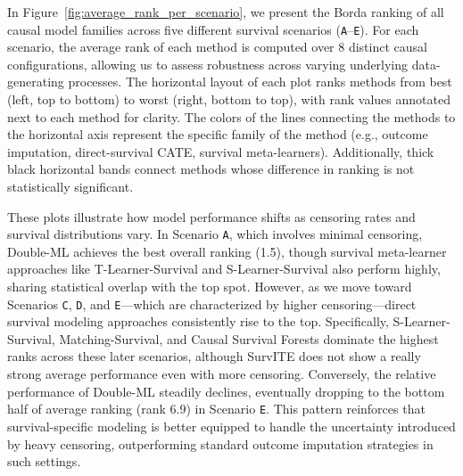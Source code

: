 \documentclass{article} %
\begin{document}
In Figure~\ref{fig:average_rank_per_scenario}, we present the Borda ranking of all causal model families across five different survival scenarios (\texttt{A}--\texttt{E}). For each scenario, the average rank of each method is computed over 8 distinct causal configurations, allowing us to assess robustness across varying underlying data-generating processes. The horizontal layout of each plot ranks methods from best (left, top to bottom) to worst (right, bottom to top), with rank values annotated next to each method for clarity. The colors of the lines connecting the methods to the horizontal axis represent the specific family of the method (e.g., outcome imputation, direct-survival CATE, survival meta-learners). Additionally, thick black horizontal bands connect methods whose difference in ranking is not statistically significant.

These plots illustrate how model performance shifts as censoring rates and survival distributions vary. In Scenario \texttt{A}, which involves minimal censoring, Double-ML achieves the best overall ranking (1.5), though survival meta-learner approaches like T-Learner-Survival and S-Learner-Survival also perform highly, sharing statistical overlap with the top spot. However, as we move toward Scenarios \texttt{C}, \texttt{D}, and \texttt{E}---which are characterized by higher censoring---direct survival modeling approaches consistently rise to the top. Specifically, S-Learner-Survival, Matching-Survival, and Causal Survival Forests dominate the highest ranks across these later scenarios, although SurvITE does not show a really strong average performance even with more censoring. Conversely, the relative performance of Double-ML steadily declines, eventually dropping to the bottom half of average ranking (rank 6.9) in Scenario \texttt{E}. This pattern reinforces that survival-specific modeling is better equipped to handle the uncertainty introduced by heavy censoring, outperforming standard outcome imputation strategies in such settings.

\end{document}
